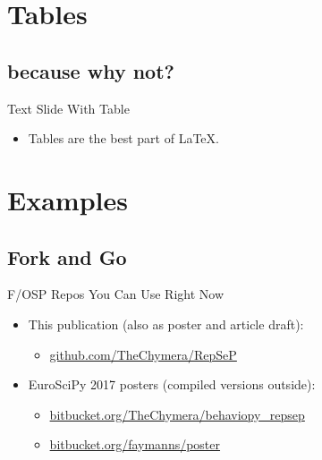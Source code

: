 \documentclass[xcolor=table,aspectratio=43,dvipsnames]{beamer}
\begin{document}
	\section{Tables}
		\subsection{because why not?}
			\begin{frame}{Text Slide With Table}
				\begin{itemize}
					\item Tables are the best part of \LaTeX.
				\end{itemize}
				\begin{table}[]
					\vspace{0.4em}
                                        \vspace{0.4em}
				\end{table}
			\end{frame}
	\section{Examples}
		\subsection{Fork and Go}
			\begin{frame}{F/OSP Repos You Can Use Right Now}
				\begin{itemize}
					\item This publication (also as poster and article draft):
						\begin{itemize}
							\item \href{https://github.com/TheChymera/RepSeP}{github.com/TheChymera/RepSeP}
						\end{itemize}
					\item EuroSciPy 2017 posters (compiled versions outside):
						\begin{itemize}
							\item \href{https://bitbucket.org/TheChymera/behaviopy\_repsep/}{bitbucket.org/TheChymera/behaviopy\_repsep}
							\item \href{https://bitbucket.org/faymanns/poster}{bitbucket.org/faymanns/poster}
						\end{itemize}
				\end{itemize}
			\end{frame}
\end{document}
